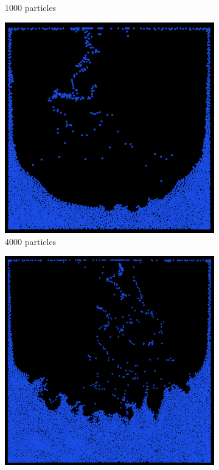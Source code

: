 \begin{figure}[h]
\begin{subfigure}[b]{0.2\textwidth}
        \caption{1000 particles}
    \end{subfigure}
    \hspace{1em}
    \begin{subfigure}[b]{0.2\textwidth}
        \includegraphics[width=\textwidth]{figures/apic4000.png}
        \caption{4000 particles}
    \end{subfigure}
    \hspace{1em}
    \begin{subfigure}[b]{0.2\textwidth}
        \includegraphics[width=\textwidth]{figures/apic8000.png}

\end{subfigure}
\end{figure}
